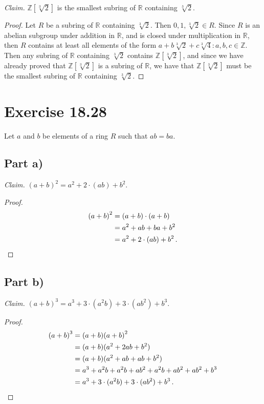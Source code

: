 \documentclass{abrice}
\newcommand{\Z}{\mathbb{Z}}
\newcommand{\R}{\mathbb{R}}
\begin{document}
\emph{Claim.} $\Z[\sqrt[3]{2}]$ is the smallest subring of $\R$ containing
$\sqrt[3]{2}$.

\begin{proof}
  Let $R$ be a subring of $\R$ containing $\sqrt[3]{2}$. Then $0,1,\sqrt[3]{2}
  \in R$. Since $R$ is an abelian subgroup under addition in $\R$, and is closed
  under multiplication in $\R$, then $R$ contains at least all elements of the
  form $a + b\sqrt[3]{2} + c\sqrt[3]{4} : a,b,c \in \Z$. Then any subring of
  $\R$ containing $\sqrt[3]{2}$ contains $\Z[\sqrt[3]{2}]$, and since we have
  already proved that $\Z[\sqrt[3]{2}]$ is a subring of $\R$, we have that
  $\Z[\sqrt[3]{2}]$ must be the smallest subring of $\R$ containing
  $\sqrt[3]{2}$.
\end{proof}

\section{Exercise 18.28}

Let $a$ and $b$ be elements of a ring $R$ such that $ab = ba$.

\subsection{Part a)}

\emph{Claim.} ${(a + b)}^2 = a^2 + 2 \cdot (ab) + b^2$.

\begin{proof}
  \begin{align*}
    {(a + b)}^2
    &= (a + b) \cdot (a + b) \\
    &= a^2 + ab + ba + b^2 \\
    &= a^2 + 2 \cdot (ab) + b^2\, . \qedhere
  \end{align*}
\end{proof}

\subsection{Part b)}

\emph{Claim.} ${(a + b)}^3 = a^3 + 3 \cdot (a^2b) + 3 \cdot (ab^2) + b^3$.

\begin{proof}
  \begin{align*}
    {(a + b)}^3
    &= (a + b){(a + b)}^2 \\
    &= (a + b)(a^2 + 2ab + b^2) \\
    &= (a + b)(a^2 + ab + ab + b^2) \\
    &= a^3 + a^2 b + a^2 b + a b^2 + a^2 b + a b^2 + a b^2 + b^3 \\
    &= a^3 + 3 \cdot (a^2b) + 3 \cdot (ab^2) + b^3\, . \qedhere
  \end{align*}
\end{proof}
\end{document}

